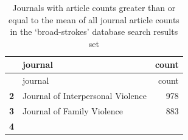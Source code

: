 \documentclass[]{tufte-handout}
\begin{document}
\begin{longtable}[]{@{}rlr@{}}
\caption{Journals with article counts greater than or equal to the mean
of all journal article counts in the `broad-strokes' database search
results set}\tabularnewline
\toprule
\begin{minipage}[b]{0.11\columnwidth}\raggedleft\strut
~\strut
\end{minipage} & \begin{minipage}[b]{0.56\columnwidth}\raggedright\strut
journal\strut
\end{minipage} & \begin{minipage}[b]{0.09\columnwidth}\raggedleft\strut
count\strut
\end{minipage}\tabularnewline
\midrule
\endfirsthead
\toprule
\begin{minipage}[b]{0.11\columnwidth}\raggedleft\strut
~\strut
\end{minipage} & \begin{minipage}[b]{0.56\columnwidth}\raggedright\strut
journal\strut
\end{minipage} & \begin{minipage}[b]{0.09\columnwidth}\raggedleft\strut
count\strut
\end{minipage}\tabularnewline
\midrule
\endhead
\begin{minipage}[t]{0.11\columnwidth}\raggedleft\strut
\textbf{2}\strut
\end{minipage} & \begin{minipage}[t]{0.56\columnwidth}\raggedright\strut
Journal of Interpersonal Violence\strut
\end{minipage} & \begin{minipage}[t]{0.09\columnwidth}\raggedleft\strut
978\strut
\end{minipage}\tabularnewline
\begin{minipage}[t]{0.11\columnwidth}\raggedleft\strut
\textbf{3}\strut
\end{minipage} & \begin{minipage}[t]{0.56\columnwidth}\raggedright\strut
Journal of Family Violence\strut
\end{minipage} & \begin{minipage}[t]{0.09\columnwidth}\raggedleft\strut
883\strut
\end{minipage}\tabularnewline
\begin{minipage}[t]{0.11\columnwidth}\raggedleft\strut
\textbf{4}\strut
\end{minipage} & \begin{minipage}[t]{0.56\columnwidth}\raggedright\strut

\end{minipage}
\end{longtable}
\end{document}
